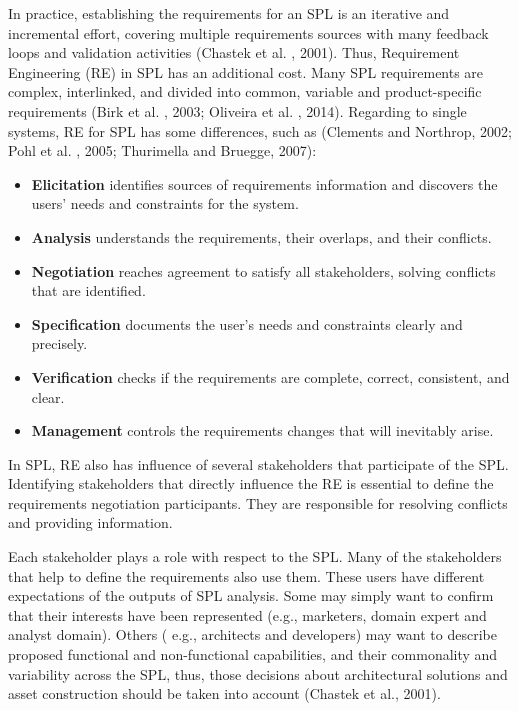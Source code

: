 In practice, establishing the requirements for an SPL is an iterative and
incremental effort, covering multiple requirements sources with many feedback loops and validation activities 
(Chastek et al. , 2001). Thus, Requirement Engineering (RE) in SPL has an additional cost. Many SPL requirements 
are complex, interlinked, and divided into common, variable and product-specific requirements (Birk et al. , 2003; 
Oliveira et al. , 2014). Regarding to single systems, RE for SPL has some differences, such as 
(Clements and Northrop, 2002; Pohl et al. , 2005; Thurimella and Bruegge, 2007):

\begin{itemize}
\item \textbf{Elicitation} identifies sources of requirements information and discovers the 
users’ needs and constraints for the system.
\item \textbf{Analysis} understands the requirements, their overlaps, and their conflicts.
\item \textbf{Negotiation} reaches agreement to satisfy all stakeholders,
solving conflicts that are identified.
\item \textbf{Specification} documents the user’s needs and constraints clearly and precisely.
\item \textbf{Verification} checks if the requirements are complete, correct, consistent, and clear.
\item \textbf{Management} controls the requirements changes that will inevitably arise.
\end{itemize}

In SPL, RE also has influence of several stakeholders that participate of the
SPL. Identifying stakeholders that directly influence the RE is essential to define the 
requirements negotiation participants. They are responsible for resolving conflicts and providing information. 

Each stakeholder plays a role with respect to the SPL. Many of the stakeholders
that help to define the requirements also use them. These users have different expectations of 
the outputs of SPL analysis. Some may simply want to confirm that their interests have been represented 
(e.g., marketers, domain expert and analyst domain). Others ( e.g., architects and developers) may want to 
describe proposed functional and non-functional capabilities, and their commonality and variability across 
the SPL, thus, those decisions about architectural solutions and asset construction should be taken into account 
(Chastek et al., 2001).

